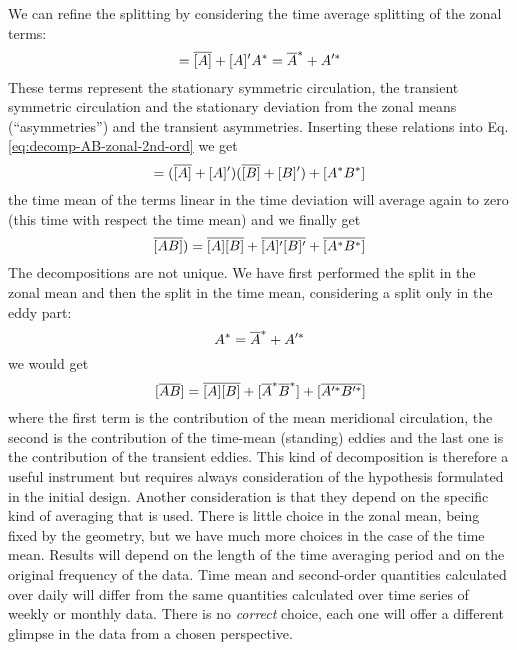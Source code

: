 We can refine the splitting by considering the time average splitting of
the zonal terms:
\begin{equation}
	= \overline{[A]} + [A]'
	A^* = \overline{A}^* + A'^*
\end{equation}
These terms represent the stationary symmetric circulation, the
transient symmetric circulation and the stationary deviation from the
zonal means (``asymmetries'') and the transient asymmetries.
Inserting these relations into Eq. \ref{eq:decomp-AB-zonal-2nd-ord} we get
\begin{equation}
	= (\overline{[A]} + [A]')(\overline{[B]} + [B]') + [A^*B^*]
\end{equation}
the time mean of the terms linear in the time deviation will average
again to zero (this time with respect the time mean) and we finally get
\begin{equation}
	\overline{[AB]}) = \overline{[A]}\overline{[B]} + \overline{[A]'[B]'} + \overline{[A^*B^*]}
\end{equation}
The decompositions are not unique. We have first performed the split in
the zonal mean and then the split in the time mean, considering a split
only in the eddy part:
\begin{equation}
	A^* =    \overline{A}^* + A'^*
\end{equation}
we would get
\begin{equation}
	[\overline{AB}] = \overline{[A]}\overline{[B]} +  [\overline{A}^*\overline{B}^*]+[\overline{A'^*B'^*}]
\end{equation}
where the first term is the contribution of the mean meridional
circulation, the second is the contribution of the time-mean
(standing) eddies and the last one is the contribution of the
transient eddies. This kind of decomposition is therefore a useful instrument but
requires always consideration of the hypothesis formulated in the
initial design. Another consideration is that they depend on the
specific kind of averaging that is used. There is little choice in the
zonal mean, being fixed by the geometry, but we have much more choices
in the case of the time mean. Results will depend on the length of the
time averaging period and on the original frequency of the data. Time
mean and second-order quantities calculated over daily will differ from
the same quantities calculated over time series of weekly or monthly
data. There is no \emph{correct} choice, each one will offer a different
glimpse in the data from a chosen perspective.
